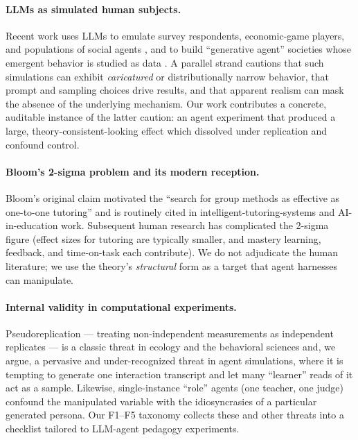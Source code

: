 \documentclass[11pt]{article}
\begin{document}
\paragraph{LLMs as simulated human subjects.}
Recent work uses LLMs to emulate survey respondents, economic-game players, and
populations of social agents \citep{argyle2023, aher2023}, and to build ``generative
agent'' societies whose emergent behavior is studied as data \citep{park2023}.  A
parallel strand cautions that such simulations can exhibit \emph{caricatured} or
distributionally narrow behavior, that prompt and sampling choices drive results, and
that apparent realism can mask the absence of the underlying mechanism.  Our work
contributes a concrete, auditable instance of the latter caution: an agent experiment
that produced a large, theory-consistent-looking effect which dissolved under
replication and confound control.

\paragraph{Bloom's 2-sigma problem and its modern reception.}
Bloom's \citeyearpar{bloom1984} original claim motivated the ``search for group
methods as effective as one-to-one tutoring'' and is routinely cited in
intelligent-tutoring-systems and AI-in-education work.  Subsequent human research has
complicated the 2-sigma figure (effect sizes for tutoring are typically smaller, and
mastery learning, feedback, and time-on-task each contribute).  We do not adjudicate
the human literature; we use the theory's \emph{structural} form as a target that
agent harnesses can manipulate.

\paragraph{Internal validity in computational experiments.}
Pseudoreplication --- treating non-independent measurements as independent replicates
--- is a classic threat in ecology and the behavioral sciences \citep{hurlbert1984}
and, we argue, a pervasive and under-recognized threat in agent simulations, where it
is tempting to generate one interaction transcript and let many ``learner'' reads of
it act as a sample.  Likewise, single-instance ``role'' agents (one teacher, one
judge) confound the manipulated variable with the idiosyncrasies of a particular
generated persona.  Our F1--F5 taxonomy collects these and other threats into a
checklist tailored to LLM-agent pedagogy experiments.
\end{document}
